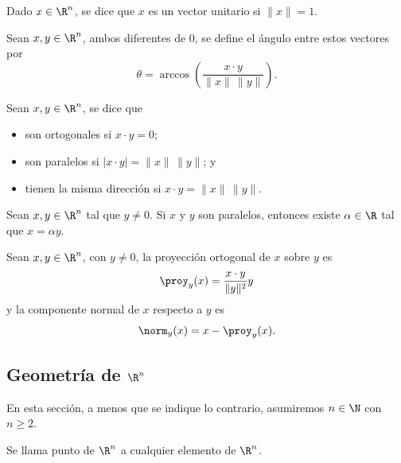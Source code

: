 \documentclass[a4,11pt]{aleph-notas}
\begin{document}
\begin{defi}
    Dado $x\in\R^n$, se dice que $x$ es un vector unitario si $\|x\|=1$.
\end{defi}

    

\begin{defi}
    Sean $x,y\in\R^n$, ambos diferentes de 0, se define el ángulo entre estos vectores por
    \[
       \theta =  \arccos\left( \frac{x\cdot y}{\|x\|\,\|y\|} \right).
    \]
\end{defi}

\begin{defi}
    Sean $x,y\in\R^n$, se dice que 
    \begin{itemize}
    \item 
        son ortogonales si $x\cdot y =0$;
    \item
        son paralelos si $|x\cdot y| = \|x\|\,\|y\|$; y
    \item
        tienen la misma dirección si $x\cdot y = \|x\|\,\|y\|$.
    \end{itemize}
\end{defi}

\begin{teo}
    Sean $x,y\in\R^n$ tal que $y\neq 0$. Si $x$ y $y$ son paralelos, entonces existe $\alpha\in\R$ tal que $x=\alpha y$.
\end{teo}

\begin{defi}
    Sean $x,y\in\R^n$, con $y\neq 0$, la proyección ortogonal de $x$ sobre $y$ es
    \[
        \proy_y(x) = \frac{x\cdot y}{\|y\|^2} y
    \]
    y la componente normal de $x$ respecto a $y$ es
    \[
        \norm_y(x) = x - \proy_y(x).
    \]
\end{defi}


\subsection{Geometría de $\R^n$}

En esta sección, a menos que se indique lo contrario, asumiremos $n\in\N$ con $n\geq 2$.

\begin{defi}[Puntos de $\R^n$]
    Se llama punto de $\R^n$ a cualquier elemento de $\R^n$. 
\end{defi}
\end{document}
